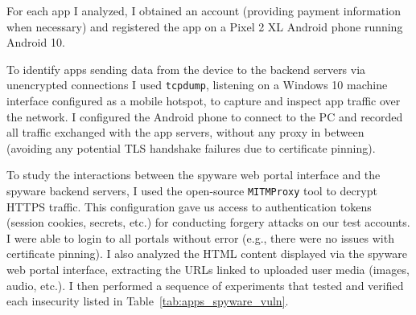 For each app I analyzed, I obtained an account (providing payment
information when necessary) and registered the app on a Pixel 2 XL
Android phone running Android 10.

To identify apps sending data from the device to the backend servers via unencrypted connections I used \texttt{tcpdump},
listening on a Windows 10 machine interface configured as a mobile
hotspot, to capture and inspect app traffic over the network.  I
configured the Android phone to connect to the PC and recorded all
traffic exchanged with the app servers, without any proxy in between
(avoiding any potential TLS handshake failures due to certificate
pinning).

To study the interactions between the spyware web portal interface and
the spyware backend servers, I used the open-source \texttt{MITMProxy} tool to
decrypt HTTPS traffic.  This configuration gave us access to
authentication tokens (session cookies, secrets, etc.) for conducting
forgery attacks on our test accounts.  I were able to login to all
portals without error (e.g., there were no issues with certificate
pinning).  I also analyzed the HTML content displayed via the spyware
web portal interface, extracting the URLs linked to uploaded user
media (images, audio, etc.).  I then performed a sequence of
experiments that tested and verified each insecurity listed in
Table~\ref{tab:apps_spyware_vuln}.




